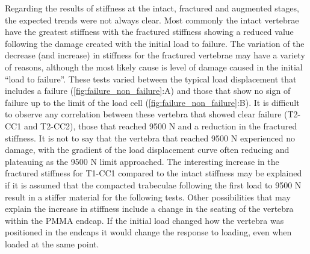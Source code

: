 
Regarding the results of stiffness at the intact, fractured and augmented
stages, the expected trends were not always clear.  Most commonly the intact
vertebrae have the greatest stiffness with the fractured stiffness showing a
reduced value following the damage created with the initial load to failure.
The variation of the decrease (and increase) in stiffness for the fractured
vertebrae may have a variety of reasons, although the most likely cause is
level of damage caused in the initial ``load to failure''.  These tests varied
between the typical load displacement that includes a failure
(\cref{fig:failure_non_failure}:A) and those that show no sign of failure up to
the limit of the load cell (\cref{fig:failure_non_failure}:B).  It is difficult
to observe any correlation between these vertebra that showed clear failure
(T2-CC1 and T2-CC2), those that reached 9500 N and a reduction in the fractured
stiffness.  It is not to say that the vertebra that reached 9500 N experienced
no damage, with the gradient of the load displacement curve often reducing and
plateauing as the 9500 N limit approached.  The interesting increase in the
fractured stiffness for T1-CC1 compared to the intact stiffness may be
explained if it is assumed that the compacted trabeculae following the first
load to 9500 N result in a stiffer material for the following tests. Other
possibilities that may explain the increase in stiffness include a change in
the seating of the vertebra within the PMMA endcap. If the initial load changed
how the vertebra was positioned in the endcaps it would change the response to
loading, even when loaded at the same point.

